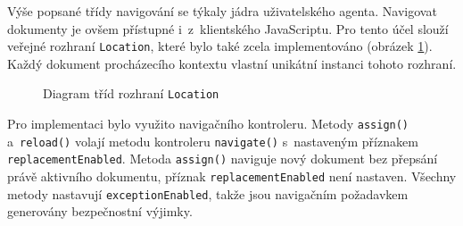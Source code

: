 Výše popsané třídy navigování se týkaly jádra uživatelského agenta. Navigovat dokumenty je ovšem přístupné i~z~klientského JavaScriptu. Pro tento účel slouží veřejné rozhraní \texttt{Location}, které bylo také zcela implementováno (obrázek \ref{Figure.Location}). Každý dokument procházecího kontextu vlastní unikátní instanci tohoto rozhraní.

\begin{figure}[H]
  \begin{center}
    \caption{Diagram tříd rozhraní \texttt{Location}}
    \label{Figure.Location}
  \end{center}
\end{figure}
 
Pro implementaci bylo využito navigačního kontroleru. Metody \texttt{assign()} a~\texttt{reload()} volají metodu kontroleru \texttt{navigate()} s~nastaveným příznakem \texttt{replacementEnabled}. Metoda \texttt{assign()} naviguje nový dokument bez přepsání právě aktivního dokumentu, příznak \texttt{replacementEnabled} není nastaven. Všechny metody nastavují \texttt{exceptionEnabled}, takže jsou navigačním požadavkem generovány bezpečnostní výjimky.

